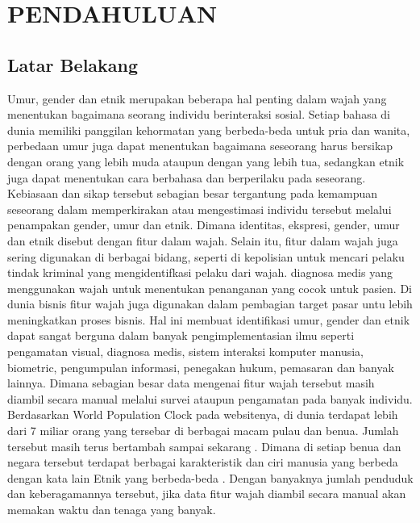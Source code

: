 \section{PENDAHULUAN}

\subsection{Latar Belakang}

Umur, gender dan etnik merupakan beberapa hal penting dalam wajah yang menentukan bagaimana seorang 
individu berinteraksi sosial. Setiap bahasa di dunia memiliki panggilan kehormatan yang berbeda-beda 
untuk pria dan wanita, perbedaan umur juga dapat menentukan bagaimana seseorang harus bersikap dengan 
orang yang lebih muda ataupun dengan yang lebih tua, sedangkan etnik juga dapat menentukan cara berbahasa 
dan berperilaku pada seseorang. Kebiasaan dan sikap tersebut sebagian besar tergantung pada kemampuan 
seseorang dalam memperkirakan atau mengestimasi individu tersebut melalui penampakan gender, umur dan 
etnik. Dimana identitas, ekspresi, gender, umur dan etnik disebut dengan fitur dalam wajah.
Selain itu, fitur dalam wajah juga sering digunakan di berbagai bidang, seperti di kepolisian untuk 
mencari pelaku tindak kriminal yang mengidentifkasi pelaku dari wajah. diagnosa medis yang menggunakan 
wajah untuk menentukan penanganan yang cocok untuk pasien. Di dunia bisnis fitur wajah juga digunakan 
dalam pembagian target pasar untu lebih meningkatkan proses bisnis.
Hal ini membuat identifikasi umur, gender dan etnik dapat sangat berguna dalam banyak pengimplementasian 
ilmu seperti pengamatan visual, diagnosa medis, sistem interaksi komputer manusia, biometric, pengumpulan 
informasi, penegakan hukum, pemasaran dan banyak lainnya. Dimana sebagian besar data mengenai fitur wajah 
tersebut masih diambil secara manual melalui survei ataupun pengamatan pada banyak individu.
Berdasarkan World Population Clock pada websitenya, di dunia terdapat lebih dari 7 miliar orang yang 
tersebar di berbagai macam pulau dan benua. Jumlah tersebut masih terus bertambah sampai sekarang \citep{Worldometer}.
Dimana di setiap benua dan negara tersebut terdapat berbagai karakteristik dan ciri manusia yang berbeda 
dengan kata lain Etnik yang berbeda-beda \citep{Infoplease}. Dengan banyaknya jumlah penduduk dan keberagamannya tersebut, 
jika data fitur wajah diambil secara manual akan memakan waktu dan tenaga yang banyak.


